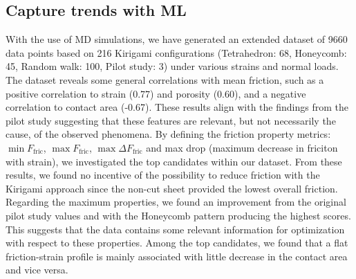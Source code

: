 



\subsection{Capture trends with ML}
With the use of \acrshort{MD} simulations, we have generated an extended dataset
of 9660 data points based on 216 Kirigami configurations (Tetrahedron: 68,
Honeycomb: 45, Random walk: 100, Pilot study: 3) under various strains and normal loads. The dataset reveals some general correlations with mean friction,
such as a positive correlation to strain (0.77)
and porosity (0.60), and a negative correlation to contact area (-0.67). These
results align with the findings from the pilot study suggesting that these
features are relevant, but not necessarily the cause, of the observed phenomena.
By defining the friction property metrics: $\min F_{\text{fric}}$,  $\max
F_{\text{fric}}$, $\max \Delta F_{\text{fric}}$ and max drop (maximum decrease in friciton with strain), we investigated
the top candidates within our dataset. From these results, we found no incentive of the possibility to reduce friction with the Kirigami approach since
the non-cut sheet provided the lowest overall friction. Regarding the maximum
properties, we found an improvement from the original pilot study values and
with the Honeycomb pattern producing the highest scores. This suggests that the data contains some relevant information for optimization with respect to
these properties. Among the top candidates, we found that a flat friction-strain profile is mainly associated with little decrease in the
contact area and vice versa. 

